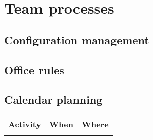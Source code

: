 \section{Team processes}

\subsection{Configuration management}

\subsection{Office rules}

\subsection{Calendar planning}


\begin{table}
    \centering
    \begin{tabular}{l|l|l}
        \rowcolor{Gray}
        \textbf{Activity} & \textbf{When} & \textbf{Where}\\\hline
                             & &
    \end{tabular}
    \label{tab:roleTypes}
\end{table}
